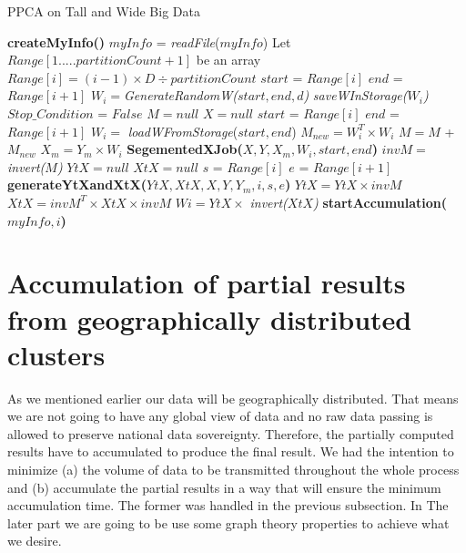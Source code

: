 \documentclass[12pt,notitlepage,oneside]{report}
\begin{document}
\begin{algorithm} [!htbp]
  \caption{PPCA on Tall and Wide Big Data}
  \begin{algorithmic}[1]
  	\label{tallnwide}
  \STATE \textbf{createMyInfo()}
  \STATE $myInfo$ = \textit{readFile}($myInfo$)
  \STATE Let $Range[1.....partitionCount+1]$ be an array %
  	\STATE $Range[i] = (i-1)\times D \div partitionCount$
  \ENDFOR
  		\STATE $start$ = $Range[i]$  
		\STATE $end$ = $Range[i+1]$ 
		\STATE $W_i = $\textit{GenerateRandomW($start, end, d$)}
		\STATE \textit{saveWInStorage($W_i$)}
  \ENDFOR
  \STATE $Stop\_Condition$ = $False$
  	  \STATE $M = null$ 
  \STATE $X = null$
		\STATE $start$ = $Range[i]$  
		\STATE $end$ = $Range[i+1]$  
		\STATE $W_i =$ \textit{loadWFromStorage}($start, end$)
		\STATE $M_{new} = W_i^T \times W_i$
		\STATE $M = M$ + $M_{new}$
		\STATE $X_m = Y_m \times W_i$
		\STATE \textbf{SegementedXJob($X, Y, X_m, W_i, start, end$)}
	\ENDFOR
	\STATE $invM = $\textit{invert($M$)}
	\STATE $YtX = null$
	\STATE $XtX = null$
		\STATE $s$ = $Range[i]$  
		\STATE $e$ = $Range[i+1]$  
		\STATE \textbf{generateYtXandXtX($YtX,XtX,X,Y,Y_m,i,s,e$)}
		\STATE $YtX = YtX \times invM$
		\STATE $XtX = invM^T \times XtX \times invM$
		\STATE $Wi = YtX \times $ \textit{invert($XtX$)}
		\STATE \textbf{startAccumulation($myInfo, i$)}
	\ENDFOR
  \ENDWHILE
  \end{algorithmic}
\end{algorithm}


\section{Accumulation of partial results from geographically distributed clusters}
As we mentioned earlier our data will be geographically distributed. That means we are not going to have any global view of data and no raw data passing is allowed to preserve national data sovereignty. Therefore, the partially computed results have to accumulated to produce the final result. We had the intention to minimize (a) the volume of data to be transmitted throughout the whole process and (b) accumulate the partial results in a way that will ensure the minimum accumulation time.
The former was handled in the previous subsection. In The later part we are going to be use some graph theory properties to achieve what we desire.
\end{document}
